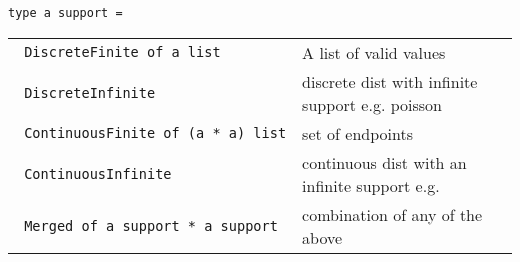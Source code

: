 \protect\hyperlink{type-support}{}\texttt{type\ \textquotesingle{}a\ support}\texttt{\ =\ }

\begin{longtable}[c]{@{}ll@{}}
\toprule
\begin{minipage}[t]{0.47\columnwidth}\raggedright\strut
\protect\hyperlink{type-support.DiscreteFinite}{}\texttt{\textbar{}\ }\texttt{DiscreteFinite\ of\ \textquotesingle{}a\ list}
\strut\end{minipage} &
\begin{minipage}[t]{0.47\columnwidth}\raggedright\strut
A list of valid values
\strut\end{minipage}\tabularnewline
\begin{minipage}[t]{0.47\columnwidth}\raggedright\strut
\protect\hyperlink{type-support.DiscreteInfinite}{}\texttt{\textbar{}\ }\texttt{DiscreteInfinite}
\strut\end{minipage} &
\begin{minipage}[t]{0.47\columnwidth}\raggedright\strut
discrete dist with infinite support e.g. poisson
\strut\end{minipage}\tabularnewline
\begin{minipage}[t]{0.47\columnwidth}\raggedright\strut
\protect\hyperlink{type-support.ContinuousFinite}{}\texttt{\textbar{}\ }\texttt{ContinuousFinite\ of\ (\textquotesingle{}a\ *\ \textquotesingle{}a)\ list}
\strut\end{minipage} &
\begin{minipage}[t]{0.47\columnwidth}\raggedright\strut
set of endpoints
\strut\end{minipage}\tabularnewline
\begin{minipage}[t]{0.47\columnwidth}\raggedright\strut
\protect\hyperlink{type-support.ContinuousInfinite}{}\texttt{\textbar{}\ }\texttt{ContinuousInfinite}
\strut\end{minipage} &
\begin{minipage}[t]{0.47\columnwidth}\raggedright\strut
continuous dist with an infinite support e.g.
\strut\end{minipage}\tabularnewline
\begin{minipage}[t]{0.47\columnwidth}\raggedright\strut
\protect\hyperlink{type-support.Merged}{}\texttt{\textbar{}\ }\texttt{Merged\ of\ \textquotesingle{}a\ support\ *\ \textquotesingle{}a\ support}
\strut\end{minipage} &
\begin{minipage}[t]{0.47\columnwidth}\raggedright\strut
combination of any of the above
\strut\end{minipage}\tabularnewline
\bottomrule
\end{longtable}

